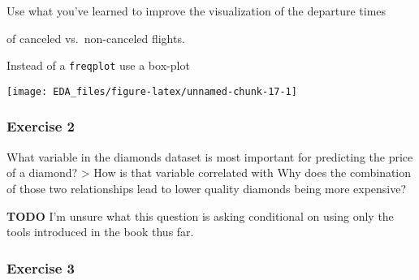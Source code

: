 \documentclass[]{book}
\newenvironment{Shaded}{\begin{snugshade}}{\end{snugshade}}
\newcommand{\DataTypeTok}[1]{\textcolor[rgb]{0.13,0.29,0.53}{#1}}
\newcommand{\DecValTok}[1]{\textcolor[rgb]{0.00,0.00,0.81}{#1}}
\newcommand{\KeywordTok}[1]{\textcolor[rgb]{0.13,0.29,0.53}{\textbf{#1}}}
\newcommand{\NormalTok}[1]{#1}
\newcommand{\OperatorTok}[1]{\textcolor[rgb]{0.81,0.36,0.00}{\textbf{#1}}}
\newcommand{\StringTok}[1]{\textcolor[rgb]{0.31,0.60,0.02}{#1}}
\theoremstyle{definition}
\theoremstyle{definition}
\theoremstyle{definition}
\theoremstyle{remark}
\begin{document}
Use what you've learned to improve the visualization of the departure
times

of canceled vs.~non-canceled flights.

Instead of a \texttt{freqplot} use a box-plot

\begin{Shaded}
\end{Shaded}

\begin{center}\texttt{[image: EDA\_files/figure-latex/unnamed-chunk-17-1]} \end{center}

\hypertarget{exercise-2-9}{%
\subsubsection{Exercise 2}\label{exercise-2-9}}

What variable in the diamonds dataset is most important for predicting
the price of a diamond? \textgreater{} How is that variable correlated
with Why does the combination of those two relationships lead to lower
quality diamonds being more expensive?

\textbf{TODO} I'm unsure what this question is asking conditional on
using only the tools introduced in the book thus far.

\hypertarget{exercise-3-7}{%
\subsubsection{Exercise 3}\label{exercise-3-7}}
\end{document}
